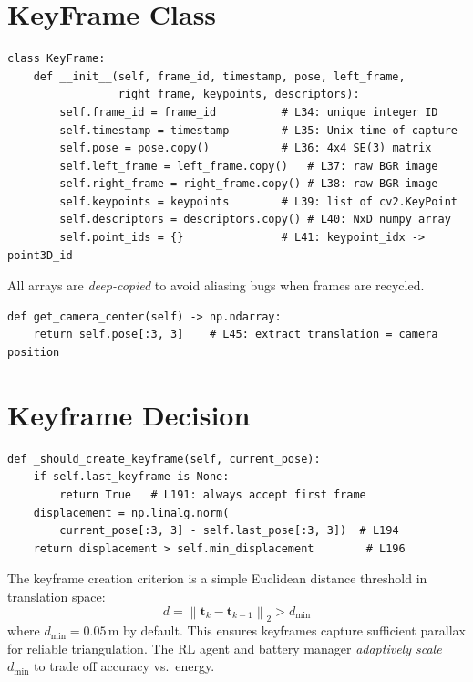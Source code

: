 \documentclass[12pt,a4paper,twoside]{report}
\theoremstyle{definition}
\newcommand{\vect}[1]{\bm{#1}}
\newcommand{\norm}[1]{\left\lVert #1 \right\rVert}
\begin{document}
\section{KeyFrame Class}

\begin{lstlisting}
class KeyFrame:
    def __init__(self, frame_id, timestamp, pose, left_frame,
                 right_frame, keypoints, descriptors):
        self.frame_id = frame_id          # L34: unique integer ID
        self.timestamp = timestamp        # L35: Unix time of capture
        self.pose = pose.copy()           # L36: 4x4 SE(3) matrix
        self.left_frame = left_frame.copy()   # L37: raw BGR image
        self.right_frame = right_frame.copy() # L38: raw BGR image
        self.keypoints = keypoints        # L39: list of cv2.KeyPoint
        self.descriptors = descriptors.copy() # L40: NxD numpy array
        self.point_ids = {}               # L41: keypoint_idx -> point3D_id
\end{lstlisting}

\noindent All arrays are \emph{deep-copied} to avoid aliasing bugs when frames
are recycled.

\begin{lstlisting}
def get_camera_center(self) -> np.ndarray:
    return self.pose[:3, 3]    # L45: extract translation = camera position
\end{lstlisting}

\section{Keyframe Decision}

\begin{lstlisting}
def _should_create_keyframe(self, current_pose):
    if self.last_keyframe is None:
        return True   # L191: always accept first frame
    displacement = np.linalg.norm(
        current_pose[:3, 3] - self.last_pose[:3, 3])  # L194
    return displacement > self.min_displacement        # L196
\end{lstlisting}

\begin{mathbox}
The keyframe creation criterion is a simple Euclidean distance threshold in
translation space:
\[
  d = \norm{\vect{t}_{k} - \vect{t}_{k-1}}_2 > d_{\min}
\]
where $d_{\min} = 0.05$\,m by default. This ensures keyframes capture
sufficient parallax for reliable triangulation. The RL agent and battery manager
\emph{adaptively scale} $d_{\min}$ to trade off accuracy vs.\ energy.
\end{mathbox}
\end{document}
